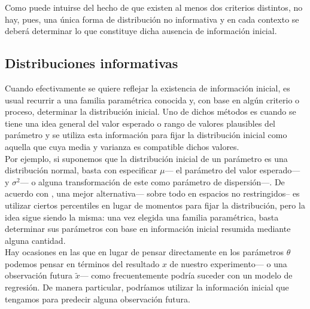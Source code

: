 {Como puede intuirse del hecho de que existen al menos dos criterios distintos, no hay, pues, una única forma de distribución no informativa y en cada contexto se deberá determinar lo que constituye dicha ausencia de información inicial.

\subsection{Distribuciones informativas}

Cuando efectivamente se quiere reflejar la existencia de información inicial, es usual recurrir a una familia paramétrica conocida y, con base en algún criterio o proceso, determinar la distribución inicial. Uno de dichos métodos es cuando se tiene una idea general del valor esperado o rango de valores plausibles del parámetro y se utiliza esta información para fijar la distribución inicial como aquella que cuya media y varianza es compatible dichos valores.\\ 

Por ejemplo, si suponemos que la distribución inicial de un parámetro es una distribución normal, basta con especificar $\mu$--- el parámetro del valor esperado--- y $\sigma^2$--- o alguna transformación de este como parámetro de dispersión---. De acuerdo con \textcite{Berger85}, una mejor alternativa--- sobre todo en espacios no restringidos-- es utilizar ciertos percentiles en lugar de momentos para fijar la distribución, pero la idea sigue siendo la misma: una vez elegida una familia paramétrica, basta determinar sus parámetros con base en información inicial resumida mediante alguna cantidad.\\

Hay ocasiones en las que en lugar de pensar directamente en los parámetros $\theta$ podemos pensar en términos del resultado $x$ de nuestro experimento--- o una observación futura $\tilde{x}$--- como frecuentemente podría suceder con un modelo de regresión. De manera particular, podríamos utilizar la información inicial que tengamos para predecir alguna observación futura.\\ 

}
